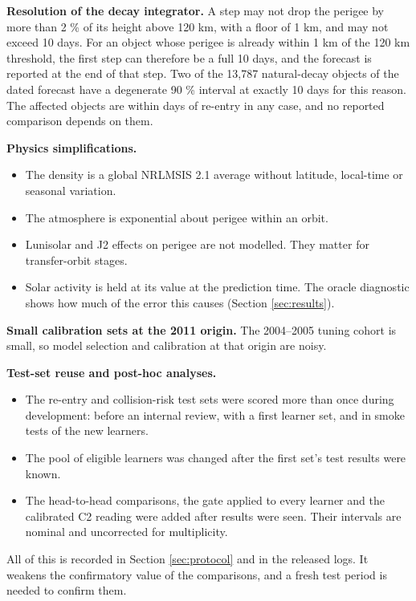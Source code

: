 \documentclass[
]{article}
\providecommand{\tightlist}{%
  \setlength{\itemsep}{0pt}\setlength{\parskip}{0pt}}
\begin{document}
\textbf{Resolution of the decay integrator.} A step may not drop the
perigee by more than 2 \% of its height above 120 km, with a floor of 1
km, and may not exceed 10 days. For an object whose perigee is already
within 1 km of the 120 km threshold, the first step can therefore be a
full 10 days, and the forecast is reported at the end of that step. Two
of the 13,787 natural-decay objects of the dated forecast have a
degenerate 90 \% interval at exactly 10 days for this reason. The
affected objects are within days of re-entry in any case, and no
reported comparison depends on them.

\textbf{Physics simplifications.}

\begin{itemize}
\tightlist
\item
  The density is a global NRLMSIS 2.1 average without latitude,
  local-time or seasonal variation.
\item
  The atmosphere is exponential about perigee within an orbit.
\item
  Lunisolar and J2 effects on perigee are not modelled. They matter for
  transfer-orbit stages.
\item
  Solar activity is held at its value at the prediction time. The oracle
  diagnostic shows how much of the error this causes (Section
  \ref{sec:results}).
\end{itemize}

\textbf{Small calibration sets at the 2011 origin.} The 2004--2005
tuning cohort is small, so model selection and calibration at that
origin are noisy.

\textbf{Test-set reuse and post-hoc analyses.}

\begin{itemize}
\tightlist
\item
  The re-entry and collision-risk test sets were scored more than once
  during development: before an internal review, with a first learner
  set, and in smoke tests of the new learners.
\item
  The pool of eligible learners was changed after the first set's test
  results were known.
\item
  The head-to-head comparisons, the gate applied to every learner and
  the calibrated C2 reading were added after results were seen. Their
  intervals are nominal and uncorrected for multiplicity.
\end{itemize}

All of this is recorded in Section \ref{sec:protocol} and in the
released logs. It weakens the confirmatory value of the comparisons, and
a fresh test period is needed to confirm them.
\end{document}

